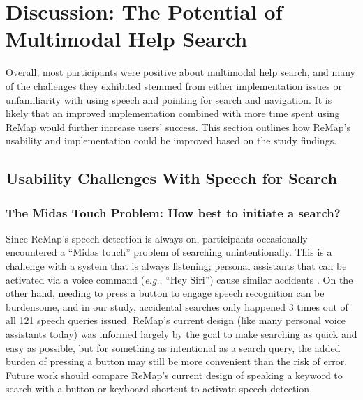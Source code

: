 \section{Discussion: The Potential of Multimodal Help Search}
Overall, most participants were positive about multimodal help search, and many of the challenges they exhibited stemmed from either implementation issues or unfamiliarity with using speech and pointing for search and navigation. It is likely that an improved implementation combined with more time spent using ReMap would further increase users' success. This section outlines how ReMap's usability and implementation could be improved based on the study findings.

\subsection{Usability Challenges With Speech for Search}
\subsubsection{The Midas Touch Problem: How best to initiate a search?}
Since ReMap's speech detection is always on, participants occasionally encountered a ``Midas touch'' problem \cite{Jacob1990} of searching unintentionally. This is a challenge with a system that is always listening; personal assistants that can be activated via a voice command (\textit{e.g.}, ``Hey Siri'') cause similar accidents \cite{Hern2019}. On the other hand, needing to press a button to engage speech recognition can be burdensome, and in our study, accidental searches only happened 3 times out of all 121 speech queries issued. ReMap's current design (like many personal voice assistants today) was informed largely by the goal to make searching as quick and easy as possible, but for something as intentional as a search query, the added burden of pressing a button may still be more convenient than the risk of error. Future work should compare ReMap's current design of speaking a keyword to search with a button or keyboard shortcut to activate speech detection. 

